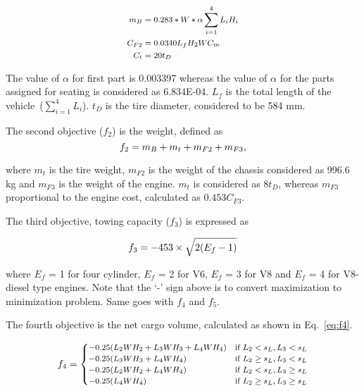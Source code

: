 \begin{equation}\footnotesize
\begin{aligned}
m_B & = 0.283*W*\alpha\sum_{i = 1}^4 L_iH_i\\
C_{F2} & = 0.0340 L_f H_2 W C_m\\
C_t & = 20 t_D
\end{aligned}
\label{eq:mb}
\end{equation}

The value of $\alpha$ for first part is 0.003397 whereas the value of $\alpha$ for the parts assigned for seating is considered as 6.834E-04. $L_f$ is the total length of the vehicle~($\sum_{i = 1}^4 L_i$). $t_D$ is the tire diameter, considered to be 584 mm. 

The second objective ($f_2$) is the weight, defined as
\begin{equation}\footnotesize
f_2 = m_B + m_t + m_{F2} + m_{F3},
\label{eq:f2}
\end{equation}

\noindent where $m_t$ is the tire weight, $m_{F2}$ is the weight of the chassis considered as 996.6 kg and $m_{F3}$ is the weight of the engine. $m_t$ is considered as $8 t_D$, whereas $m_{F3}$ proportional to the engine cost, calculated as $0.453C_{F3}$.

The third objective, towing capacity ($f_3$) is expressed as

\begin{equation}\footnotesize
f_3 = -453 \times \sqrt{2(E_f-1)} 
\label{eq:f3}
\end{equation}

\noindent where $E_f$ = 1 for four cylinder, $E_f$ = 2 for V6, $E_f$ = 3 for V8 and $E_f$ = 4 for V8-diesel type engines. Note that the `-' sign above is to convert maximization to minimization problem. Same goes with $f_4$ and $f_5$. 

The fourth objective is the net cargo volume, calculated as shown in Eq.~\ref{eq:f4}. 

\begin{equation}\footnotesize
f_4=\begin{cases}
-0.25(L_2WH_2 + L_3WH_3 + L_4WH_4) & \text{if}~L_2 < s_L, L_3 < s_L\\
-0.25(L_3WH_3 + L_4WH_4) & \text{if}~L_2 \ge s_L, L_3 < s_L\\
-0.25(L_2WH_2 + L_4WH_4) & \text{if}~L_2 < s_L, L_3 \ge s_L\\
-0.25(L_4WH_4) & \text{if}~L_2 \ge s_L, L_3 \ge s_L\\
\end{cases}
\label{eq:f4}
\end{equation}

